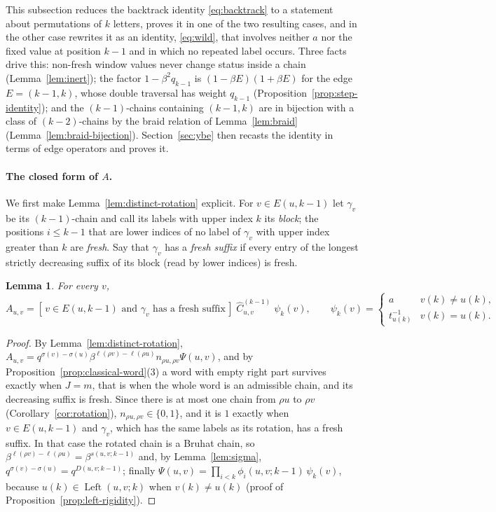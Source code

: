 \documentclass[11pt]{article}
\newtheorem{lemma}[proposition]{Lemma}
\newcommand{\Left}{\operatorname{Left}}
\newcommand{\ellength}{\ell}
\begin{document}
This subsection reduces the backtrack identity \eqref{eq:backtrack}
to a statement about permutations of $k$ letters, proves it in one
of the two resulting cases, and in the other case rewrites it as an
identity, \eqref{eq:wild}, that involves neither $a$ nor the
fixed value at position $k-1$ and in which no repeated label occurs.
Three facts drive this: non-fresh window values never change status
inside a chain (Lemma~\ref{lem:inert}); the factor
$1-\beta^2q_{k-1}$ is $(1-\beta E)(1+\beta E)$ for the edge
$E=(k-1,k)$, whose double traversal has weight $q_{k-1}$
(Proposition~\ref{prop:step-identity}); and the $(k-1)$-chains
containing $(k-1,k)$ are in bijection with a class of $(k-2)$-chains
by the braid relation of Lemma~\ref{lem:braid}
(Lemma~\ref{lem:braid-bijection}). Section~\ref{sec:ybe} then
recasts the identity in terms of edge operators and proves it.

\paragraph{The closed form of $A$.}
We first make Lemma~\ref{lem:distinct-rotation} explicit. For
$v\in E(u,k-1)$ let $\gamma_v$ be its $(k-1)$-chain and call its
labels with upper index $k$ its \emph{block}; the positions
$i\leq k-1$ that are lower indices of no label of $\gamma_v$ with
upper index greater than $k$ are \emph{fresh}. Say that $\gamma_v$
has a \emph{fresh suffix} if every entry of the longest strictly
decreasing suffix of its block (read by lower indices) is fresh.

\begin{lemma}\label{lem:A-closed}
For every $v$,
\[
 A_{u,v}=[\,v\in E(u,k-1)\text{ and }\gamma_v\text{ has a fresh suffix}\,]\;
 \widehat C^{(k-1)}_{u,v}\;\psi_k(v),
 \qquad
 \psi_k(v)=\begin{cases} a& v(k)\neq u(k),\\ t^{-1}_{u(k)}& v(k)=u(k).\end{cases}
\]
\end{lemma}

\begin{proof}
By Lemma~\ref{lem:distinct-rotation},
$A_{u,v}=q^{\sigma(v)-\sigma(u)}\beta^{\ellength(\rho v)-\ellength(\rho u)}n_{\rho u,\rho v}\Psi(u,v)$,
and by Proposition~\ref{prop:classical-word}(3) a word with empty
right part survives exactly when $J=m$, that is when the whole word
is an admissible chain, and its decreasing suffix is fresh. Since
there is at most one chain from $\rho u$ to $\rho v$
(Corollary~\ref{cor:rotation}), $n_{\rho u,\rho v}\in\{0,1\}$, and it
is $1$ exactly when $v\in E(u,k-1)$ and $\gamma_v$, which has the same
labels as its rotation, has a fresh suffix. In that case the rotated
chain is a Bruhat chain, so
$\beta^{\ellength(\rho v)-\ellength(\rho u)}=\beta^{s(u,v;k-1)}$ and,
by Lemma~\ref{lem:sigma}, $q^{\sigma(v)-\sigma(u)}=q^{D(u,v;k-1)}$;
finally $\Psi(u,v)=\prod_{i<k}\phi_i(u,v;k-1)\,\psi_k(v)$, because
$u(k)\in\Left(u,v;k)$ when $v(k)\neq u(k)$ (proof of
Proposition~\ref{prop:left-rigidity}).
\end{proof}
\end{document}
